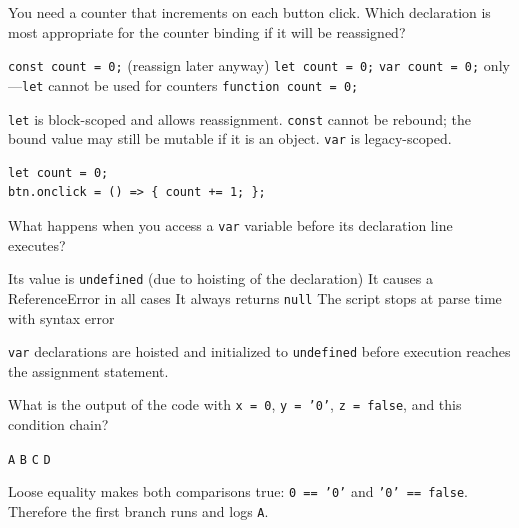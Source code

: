



\question[4]
You need a counter that increments on each button click. Which declaration is most appropriate for the counter binding if it will be reassigned?
\begin{choices}
  \choice \texttt{const count = 0;} (reassign later anyway)
  \CorrectChoice \texttt{let count = 0;}
  \choice \texttt{var count = 0;} only---\texttt{let} cannot be used for counters
  \choice \texttt{function count = 0;}
\end{choices}
\begin{solution}
  \texttt{let} is block-scoped and allows reassignment. \texttt{const} cannot be rebound; the bound value may still be mutable if it is an object. \texttt{var} is legacy-scoped.
\begin{lstlisting}[style=js]
let count = 0;
btn.onclick = () => { count += 1; };
\end{lstlisting}
\end{solution}

\question[4]
What happens when you access a \texttt{var} variable before its declaration line executes?
\begin{choices}
  \CorrectChoice Its value is \texttt{undefined} (due to hoisting of the declaration)
  \choice It causes a ReferenceError in all cases
  \choice It always returns \texttt{null}
  \choice The script stops at parse time with syntax error
\end{choices}
\begin{solution}
  \texttt{var} declarations are hoisted and initialized to \texttt{undefined} before execution reaches the assignment statement.
\end{solution}

\question[4]
What is the output of the code with \texttt{x = 0}, \texttt{y = '0'}, \texttt{z = false}, and this condition chain?
\begin{choices}
  \CorrectChoice \texttt{A}
  \choice \texttt{B}
  \choice \texttt{C}
  \choice \texttt{D}
\end{choices}
\begin{solution}
  Loose equality makes both comparisons true: \texttt{0 == '0'} and \texttt{'0' == false}. Therefore the first branch runs and logs \texttt{A}.
\end{solution}

